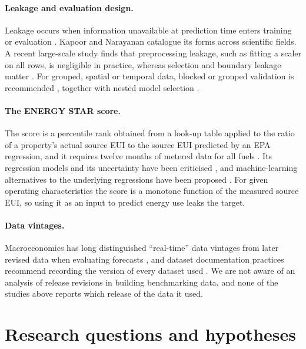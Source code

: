 \documentclass[11pt]{article}
\begin{document}
\paragraph{Leakage and evaluation design.} Leakage occurs when information unavailable at prediction time enters training or evaluation \cite{kaufman2012leakage}. Kapoor and Narayanan \cite{kapoor2023leakage} catalogue its forms across scientific fields. A recent large-scale study finds that preprocessing leakage, such as fitting a scaler on all rows, is negligible in practice, whereas selection and boundary leakage matter \cite{roth2026leakagetypes}. For grouped, spatial or temporal data, blocked or grouped validation is recommended \cite{roberts2017cv,bergmeir2012cvts}, together with nested model selection \cite{varma2006bias}.

\paragraph{The ENERGY STAR score.} The score is a percentile rank obtained from a look-up table applied to the ratio of a property's actual source EUI to the source EUI predicted by an EPA regression, and it requires twelve months of metered data for all fuels \cite{epa2021energystarscore}. Its regression models and its uncertainty have been criticised \cite{scofield2014energystar,hsu2014selfreported}, and machine-learning alternatives to the underlying regressions have been proposed \cite{arjunan2020energystarpp}. For given operating characteristics the score is a monotone function of the measured source EUI, so using it as an input to predict energy use leaks the target.

\paragraph{Data vintages.} Macroeconomics has long distinguished ``real-time'' data vintages from later revised data when evaluating forecasts \cite{croushore2001realtime}, and dataset documentation practices recommend recording the version of every dataset used \cite{gebru2021datasheets}. We are not aware of an analysis of release revisions in building benchmarking data, and none of the studies above reports which release of the data it used.

\section{Research questions and hypotheses}
\label{sec:rq}
\end{document}
